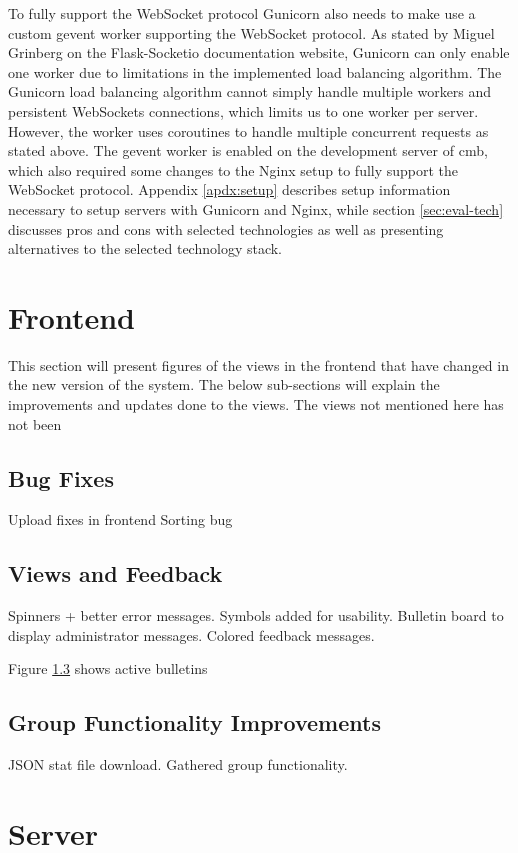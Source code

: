 To fully support the WebSocket protocol Gunicorn also needs to make use a custom gevent worker supporting the WebSocket protocol. As stated by Miguel Grinberg on the Flask-Socketio documentation website, Gunicorn can only enable one worker due to limitations in the implemented load balancing algorithm. The Gunicorn load balancing algorithm cannot simply handle multiple workers and persistent WebSockets connections, which limits us to one worker per server. However, the worker uses coroutines to handle multiple concurrent requests as stated above. The gevent worker is enabled on the development server of \gls{cmb}, which also required some changes to the Nginx setup to fully support the WebSocket protocol. Appendix \ref{apdx:setup} describes setup information necessary to setup servers with Gunicorn and Nginx, while section \ref{sec:eval-tech} discusses pros and cons with selected technologies as well as presenting alternatives to the selected technology stack.

\section{Frontend}
\label{sec:impr-frontend}
This section will present figures of the views in the frontend that have changed in the new version of the system. The below sub-sections will explain the improvements and updates done to the views. The views not mentioned here has not been

\subsection{Bug Fixes}
Upload fixes in frontend
Sorting bug

\subsection{Views and Feedback}
Spinners + better error messages. Symbols added for usability. Bulletin board to display administrator messages. Colored feedback messages.

Figure \ref{} shows active bulletins

\subsection{Group Functionality Improvements}
JSON stat file download. Gathered group functionality.

\section{Server}
\label{sec:impr-server}
